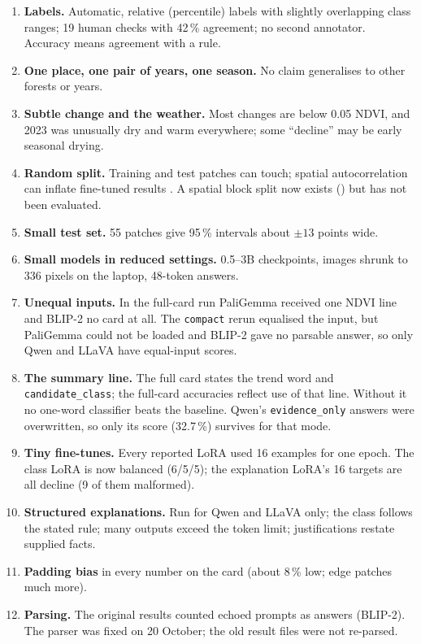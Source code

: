 \begin{enumerate}
  \item \textbf{Labels.} Automatic, relative (percentile) labels with slightly overlapping class ranges; 19 human checks with 42\,\% agreement; no second annotator. Accuracy means agreement with a rule.
  \item \textbf{One place, one pair of years, one season.} No claim generalises to other forests or years.
  \item \textbf{Subtle change and the weather.} Most changes are below 0.05 NDVI, and 2023 was unusually dry and warm everywhere; some ``decline'' may be early seasonal drying.
  \item \textbf{Random split.} Training and test patches can touch; spatial autocorrelation can inflate fine-tuned results \citep{roberts2017,ploton2020}. A spatial block split now exists () but has not been evaluated.
  \item \textbf{Small test set.} 55 patches give 95\,\% intervals about $\pm13$ points wide.
  \item \textbf{Small models in reduced settings.} 0.5--3B checkpoints, images shrunk to 336 pixels on the laptop, 48-token answers.
  \item \textbf{Unequal inputs.} In the full-card run PaliGemma received one NDVI line and BLIP-2 no card at all. The \texttt{compact} rerun equalised the input, but PaliGemma could not be loaded and BLIP-2 gave no parsable answer, so only Qwen and LLaVA have equal-input scores.
  \item \textbf{The summary line.} The full card states the trend word and \texttt{candidate\_class}; the full-card accuracies reflect use of that line. Without it no one-word classifier beats the baseline. Qwen's \texttt{evidence\_only} answers were overwritten, so only its score (32.7\,\%) survives for that mode.
  \item \textbf{Tiny fine-tunes.} Every reported LoRA used 16 examples for one epoch. The class LoRA is now balanced (6/5/5); the explanation LoRA's 16 targets are all decline (9 of them malformed).
  \item \textbf{Structured explanations.} Run for Qwen and LLaVA only; the class follows the stated rule; many outputs exceed the token limit; justifications restate supplied facts.
  \item \textbf{Padding bias} in every number on the card (about 8\,\% low; edge patches much more).
  \item \textbf{Parsing.} The original results counted echoed prompts as answers (BLIP-2). The parser was fixed on 20 October; the old result files were not re-parsed.

\end{enumerate}
